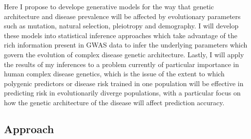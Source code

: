 \documentclass[11pt]{article}
\begin{document}
Here I propose to develope generative models for the way that genetic architecture and disease prevalence will be affected by evolutionary parameters such as mutation, natural selection, pleiotropy and demography. I will develop these models into statistical inference approaches which take advantage of the rich information present in GWAS data to infer the underlying parameters which govern the evolution of complex disease genetic architecture. Lastly, I will apply the results of my inferences to a problem currently of particular importance in human complex disease genetics, which is the issue of the extent to which polygenic predictors or disease risk trained in one population will be effective in predicting risk in evolutionarily diverge populations, with a particular focus on how the genetic architecture of the disease will affect prediction accuracy. 


\subsection*{Approach}
\end{document}
